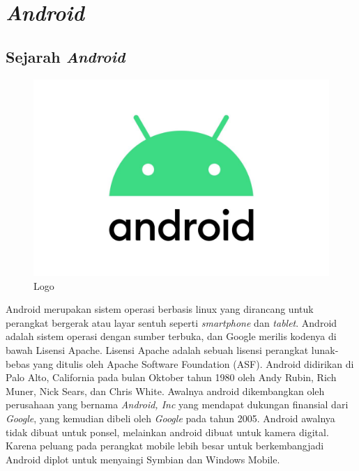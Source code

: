 \chapter{\textit{Android}}

\section{Sejarah \textit{Android}}

\begin{figure}[]
    \centering
    \includegraphics[scale=0.2]{pictures/logo_android.jpg}
    \caption{Logo}
\end{figure}

Android merupakan sistem operasi berbasis linux yang dirancang untuk perangkat bergerak atau layar sentuh seperti \textit{smartphone} dan \textit{tablet}. Android adalah sistem operasi dengan sumber terbuka, dan Google merilis kodenya di bawah Lisensi Apache. Lisensi Apache adalah sebuah lisensi perangkat lunak-bebas yang ditulis oleh Apache Software Foundation (ASF). Android didirikan di Palo Alto, California pada bulan Oktober tahun 1980 oleh Andy Rubin, Rich Muner, Nick Sears, dan Chris White. Awalnya android dikembangkan oleh perusahaan yang bernama \textit{Android, Inc} yang mendapat dukungan finansial dari \textit{Google}, yang kemudian dibeli oleh \textit{Google} pada tahun 2005. Android awalnya tidak dibuat untuk ponsel, melainkan android dibuat untuk kamera digital. Karena peluang pada perangkat mobile lebih besar untuk berkembangjadi Android diplot untuk menyaingi Symbian dan Windows Mobile.

